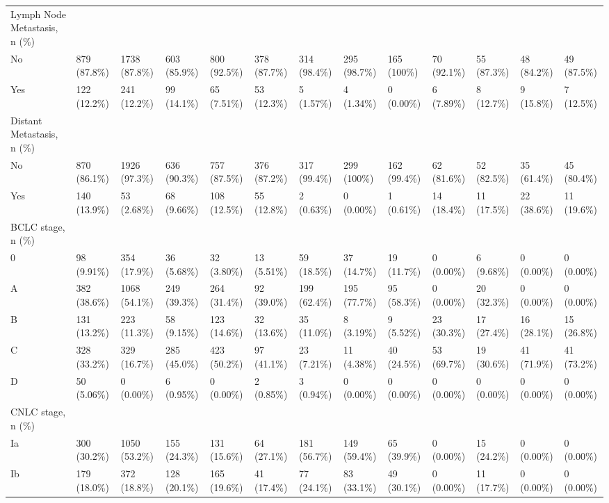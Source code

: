 \begin{landscape}
\begin{center}
\begin{longtable}{p{5.2cm}p{3.0cm}}
Lymph Node Metastasis, n (\%) &  &  &  &  &  &  &  &  &  &  &  &  \\
No & 879 (87.8\%) & 1738 (87.8\%) & 603 (85.9\%) & 800 (92.5\%) & 378 (87.7\%) & 314 (98.4\%) & 295 (98.7\%) & 165 (100\%) & 70 (92.1\%) & 55 (87.3\%) & 48 (84.2\%) & 49 (87.5\%) \\
Yes & 122 (12.2\%) & 241 (12.2\%) & 99 (14.1\%) & 65 (7.51\%) & 53 (12.3\%) & 5 (1.57\%) & 4 (1.34\%) & 0 (0.00\%) & 6 (7.89\%) & 8 (12.7\%) & 9 (15.8\%) & 7 (12.5\%) \\
Distant Metastasis, n (\%) &  &  &  &  &  &  &  &  &  &  &  &  \\
No & 870 (86.1\%) & 1926 (97.3\%) & 636 (90.3\%) & 757 (87.5\%) & 376 (87.2\%) & 317 (99.4\%) & 299 (100\%) & 162 (99.4\%) & 62 (81.6\%) & 52 (82.5\%) & 35 (61.4\%) & 45 (80.4\%) \\
Yes & 140 (13.9\%) & 53 (2.68\%) & 68 (9.66\%) & 108 (12.5\%) & 55 (12.8\%) & 2 (0.63\%) & 0 (0.00\%) & 1 (0.61\%) & 14 (18.4\%) & 11 (17.5\%) & 22 (38.6\%) & 11 (19.6\%) \\
BCLC stage, n (\%) &  &  &  &  &  &  &  &  &  &  &  &  \\
0 & 98 (9.91\%) & 354 (17.9\%) & 36 (5.68\%) & 32 (3.80\%) & 13 (5.51\%) & 59 (18.5\%) & 37 (14.7\%) & 19 (11.7\%) & 0 (0.00\%) & 6 (9.68\%) & 0 (0.00\%) & 0 (0.00\%) \\
A & 382 (38.6\%) & 1068 (54.1\%) & 249 (39.3\%) & 264 (31.4\%) & 92 (39.0\%) & 199 (62.4\%) & 195 (77.7\%) & 95 (58.3\%) & 0 (0.00\%) & 20 (32.3\%) & 0 (0.00\%) & 0 (0.00\%) \\
B & 131 (13.2\%) & 223 (11.3\%) & 58 (9.15\%) & 123 (14.6\%) & 32 (13.6\%) & 35 (11.0\%) & 8 (3.19\%) & 9 (5.52\%) & 23 (30.3\%) & 17 (27.4\%) & 16 (28.1\%) & 15 (26.8\%) \\
C & 328 (33.2\%) & 329 (16.7\%) & 285 (45.0\%) & 423 (50.2\%) & 97 (41.1\%) & 23 (7.21\%) & 11 (4.38\%) & 40 (24.5\%) & 53 (69.7\%) & 19 (30.6\%) & 41 (71.9\%) & 41 (73.2\%) \\
D & 50 (5.06\%) & 0 (0.00\%) & 6 (0.95\%) & 0 (0.00\%) & 2 (0.85\%) & 3 (0.94\%) & 0 (0.00\%) & 0 (0.00\%) & 0 (0.00\%) & 0 (0.00\%) & 0 (0.00\%) & 0 (0.00\%) \\
CNLC stage, n (\%) &  &  &  &  &  &  &  &  &  &  &  &  \\
Ia & 300 (30.2\%) & 1050 (53.2\%) & 155 (24.3\%) & 131 (15.6\%) & 64 (27.1\%) & 181 (56.7\%) & 149 (59.4\%) & 65 (39.9\%) & 0 (0.00\%) & 15 (24.2\%) & 0 (0.00\%) & 0 (0.00\%) \\
Ib & 179 (18.0\%) & 372 (18.8\%) & 128 (20.1\%) & 165 (19.6\%) & 41 (17.4\%) & 77 (24.1\%) & 83 (33.1\%) & 49 (30.1\%) & 0 (0.00\%) & 11 (17.7\%) & 0 (0.00\%) & 0 (0.00\%) \\

\end{longtable}
\end{center}
\end{landscape}
